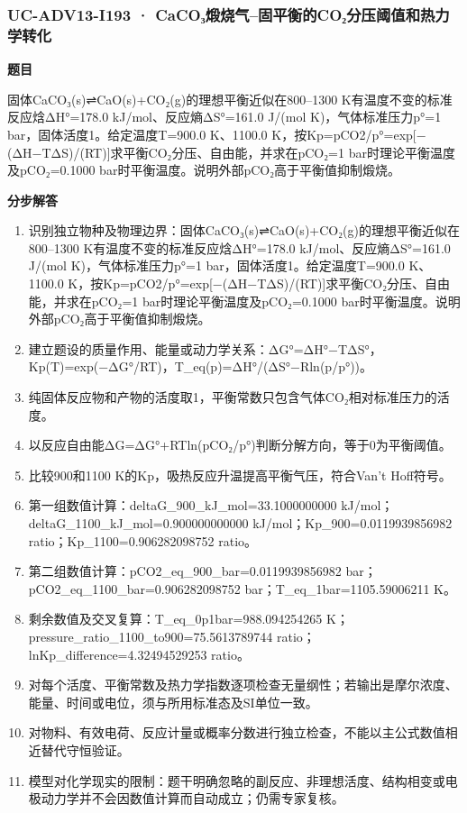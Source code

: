 \documentclass[UTF8,11pt,a4paper]{ctexart}
\begin{document}
\subsubsection*{UC-ADV13-I193 · CaCO₃煅烧气–固平衡的CO₂分压阈值和热力学转化}
\noindent\textbf{题目}\par
固体CaCO₃(s)⇌CaO(s)+CO₂(g)的理想平衡近似在800–1300 K有温度不变的标准反应焓ΔH°=178.0 kJ/mol、反应熵ΔS°=161.0 J/(mol K)，气体标准压力p°=1 bar，固体活度1。给定温度T=900.0 K、1100.0 K，按Kp=pCO2/p°=exp[−(ΔH−TΔS)/(RT)]求平衡CO₂分压、自由能，并求在pCO₂=1 bar时理论平衡温度及pCO₂=0.1000 bar时平衡温度。说明外部pCO₂高于平衡值抑制煅烧。\par
\medskip\noindent\textbf{分步解答}
\begin{enumerate}
\item 识别独立物种及物理边界：固体CaCO₃(s)⇌CaO(s)+CO₂(g)的理想平衡近似在800–1300 K有温度不变的标准反应焓ΔH°=178.0 kJ/mol、反应熵ΔS°=161.0 J/(mol K)，气体标准压力p°=1 bar，固体活度1。给定温度T=900.0 K、1100.0 K，按Kp=pCO2/p°=exp[−(ΔH−TΔS)/(RT)]求平衡CO₂分压、自由能，并求在pCO₂=1 bar时理论平衡温度及pCO₂=0.1000 bar时平衡温度。说明外部pCO₂高于平衡值抑制煅烧。
\item 建立题设的质量作用、能量或动力学关系：ΔG°=ΔH°−TΔS°，Kp(T)=exp(−ΔG°/RT)，T\_eq(p)=ΔH°/(ΔS°−Rln(p/p°))。
\item 纯固体反应物和产物的活度取1，平衡常数只包含气体CO₂相对标准压力的活度。
\item 以反应自由能ΔG=ΔG°+RTln(pCO₂/p°)判断分解方向，等于0为平衡阈值。
\item 比较900和1100 K的Kp，吸热反应升温提高平衡气压，符合Van’t Hoff符号。
\item 第一组数值计算：deltaG\_900\_kJ\_mol=33.1000000000 kJ/mol；deltaG\_1100\_kJ\_mol=0.900000000000 kJ/mol；Kp\_900=0.0119939856982 ratio；Kp\_1100=0.906282098752 ratio。
\item 第二组数值计算：pCO2\_eq\_900\_bar=0.0119939856982 bar；pCO2\_eq\_1100\_bar=0.906282098752 bar；T\_eq\_1bar=1105.59006211 K。
\item 剩余数值及交叉复算：T\_eq\_0p1bar=988.094254265 K；pressure\_ratio\_1100\_to900=75.5613789744 ratio；lnKp\_difference=4.32494529253 ratio。
\item 对每个活度、平衡常数及热力学指数逐项检查无量纲性；若输出是摩尔浓度、能量、时间或电位，须与所用标准态及SI单位一致。
\item 对物料、有效电荷、反应计量或概率分数进行独立检查，不能以主公式数值相近替代守恒验证。
\item 模型对化学现实的限制：题干明确忽略的副反应、非理想活度、结构相变或电极动力学并不会因数值计算而自动成立；仍需专家复核。
\end{enumerate}
\end{document}

